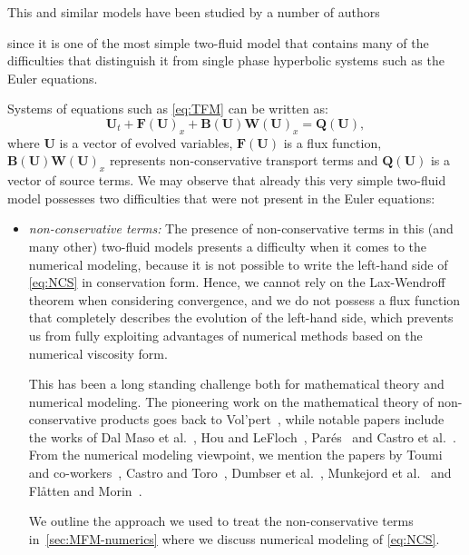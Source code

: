 This and similar models have been studied by a number of authors~{\cite{tou96,cor98,cor02,evj03,vuy04,mun07} since it is one of the most simple two-fluid model that contains many of the difficulties that distinguish it from single phase hyperbolic systems such as the Euler equations.

Systems of equations such as \eqref{eq:TFM} can be written as:
\begin{equation} \label{eq:NCS}
\mathbf{U}_t + \mathbf{F(U)}_x + \mathbf{B(U)} \mathbf{W(U)}_x = \mathbf{Q(U)},
\end{equation}
where $ \mathbf{U} $ is a vector of evolved variables, $ \mathbf{F(U)} $ is a flux function, $ \mathbf{B(U)} \mathbf{W(U)}_x $ represents non-conservative transport terms and $ \mathbf{Q(U)} $ is a vector of source terms. We may observe that already this very simple two-fluid model possesses two difficulties that were not present in the Euler equations:
\begin{itemize}
\item \textit{non-conservative terms:} The presence of non-conservative terms in this (and many other) two-fluid models presents a difficulty when it comes to the numerical modeling, because it is not possible to write the left-hand side of \eqref{eq:NCS} in conservation form. Hence, we cannot rely on the Lax-Wendroff theorem when considering convergence, and we do not possess a flux function that completely describes the evolution of the left-hand side, which prevents us from fully exploiting advantages of numerical methods based on the numerical viscosity form.

This has been a long standing challenge both for mathematical theory and numerical modeling. The pioneering work on the mathematical theory of non-conservative products goes back to Vol'pert~\cite{vol67}, while notable papers include the works of Dal Maso et al.~\cite{dal95}, Hou and LeFloch~\cite{hou94}, Par\'{e}s~\cite{par06} and Castro et al.~\cite{cas08}. From the numerical modeling viewpoint, we mention the papers by Toumi and co-workers~\cite{tou92,tou96}, Castro and Toro~\cite{cas06}, Dumbser et al.~\cite{dum10}, Munkejord et al.~\cite{mun09} and Fl\aa{}tten and Morin~\cite{fla12}.

We outline the approach we used to treat the non-conservative terms in~\cref{sec:MFM-numerics} where we discuss numerical modeling of \eqref{eq:NCS}.


\end{itemize}}
